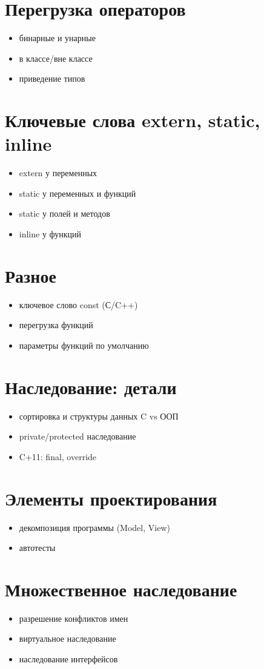 \section{Перегрузка операторов}
\begin{itemize}[noitemsep]
    \item бинарные и унарные
    \item в классе/вне классе
    \item приведение типов
\end{itemize}
\section{Ключевые слова extern, static, inline}
\begin{itemize}[noitemsep]
    \item extern у переменных
    \item static у переменных и функций
    \item static у полей и методов
    \item inline у функций
\end{itemize}
\section{Разное}
\begin{itemize}[noitemsep]
    \item ключевое слово const (С/C++)
    \item перегрузка функций
    \item параметры функций по умолчанию
\end{itemize}
\section{Наследование: детали}
\begin{itemize}[noitemsep]
    \item сортировка и структуры данных C vs ООП
    \item private/protected наследование
    \item C+11: final, override
\end{itemize}
\section{Элементы проектирования}
\begin{itemize}[noitemsep]
    \item декомпозиция программы (Model, View)
    \item автотесты
\end{itemize}
\section{Множественное наследование}
\begin{itemize}[noitemsep]
    \item разрешение конфликтов имен
    \item виртуальное наследование
    \item наследование интерфейсов
\end{itemize}

% 
